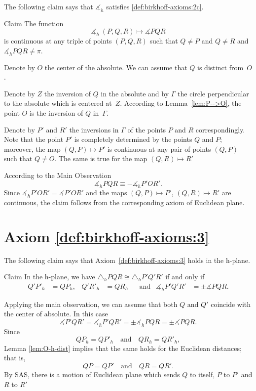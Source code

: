 The following claim says that
$\measuredangle_h$ satisfies
 \ref{def:birkhoff-axioms:2c}.

\begin{thm}{Claim}\label{clm:h2c}
The function 
$$\measuredangle_h\:(P,Q,R)\mapsto\measuredangle P Q R$$
is continuous at any triple of points $(P,Q,R)$
such that $Q\ne P$ and $Q\ne R$ and $\measuredangle_h P Q R\ne\pi$.
\end{thm}

Denote by $O$ the center of the absolute.
We can assume that $Q$ is distinct from~$O$.

Denote by $Z$ the inversion of $Q$ in the absolute
and by $\Gamma$ the circle perpendicular to the absolute which is centered at~$Z$.
According to Lemma~\ref{lem:P-->O},
the point $O$ is the inversion of $Q$ in~$\Gamma$.

Denote by $P'$ and $R'$ the inversions in $\Gamma$ of the points $P$ and $R$ correspondingly.
Note that the point $P'$ is completely determined by the points $Q$ and $P$;
moreover, the map $(Q,P)\mapsto P'$ is continuous at any pair of points $(Q,P)$ such that $Q\ne O$.
The same is true for the map $(Q,R)\mapsto R'$

According to the Main Observation 
$$\measuredangle_h P Q R\equiv -\measuredangle_h P' O R'.$$
Since $\measuredangle_h P' O R'=\measuredangle P' O R'$ and 
the maps $(Q,P)\mapsto P'$, $(Q,R)\mapsto R'$ are continuous,
the claim follows from the corresponding axiom of Euclidean plane.
\qeds

\section*{Axiom \ref{def:birkhoff-axioms:3}}

The following claim says that Axiom~\ref{def:birkhoff-axioms:3} holds in the h-plane.

\begin{thm}{Claim}
In the h-plane, we have
$\triangle_h P Q R 
\cong
\triangle_h P' Q' R'$
if and only if 
\begin{align*}
Q' P'_h&=Q P_h, & Q' R'_h&= Q R_h &&\text{and}
&\measuredangle_h P' Q' R'&=\pm\measuredangle P Q R.
\end{align*}
 
\end{thm}

Applying the main observation, 
we can assume that both $Q$ and $Q'$ coincide with the center of absolute.
In this case 
$$\measuredangle P' Q R'=\measuredangle_h P' Q R'=\pm\measuredangle_h P Q R=\pm\measuredangle P Q R.$$
Since 
$$Q P_h=Q P'_h\quad \text{and}\quad Q R_h=Q R'_h,$$
Lemma \ref{lem:O-h-dist} implies that the same holds for the Euclidean distances;
that is,
$$Q P=Q P'
\quad
\text{and}
\quad
Q R=Q R'.$$
By SAS,
there is a motion of Euclidean plane which sends $Q$ to itself, $P$ to $P'$ and $R$ to $R'$

